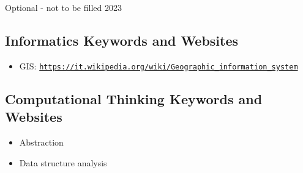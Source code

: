 \documentclass[a4paper,11pt]{report}
\newcommand{\BrochureUrlText}[1]{\texttt{#1}}
\begin{document}
Optional - not to be filled 2023


\subsection*{Informatics Keywords and Websites}

\begin{itemize}
  \item GIS: \href{https://it.wikipedia.org/wiki/Geographic_information_system}{\BrochureUrlText{https://it.wikipedia.org/wiki/Geographic\_information\_system}}
\end{itemize}


\subsection*{Computational Thinking Keywords and Websites}

\begin{itemize}
  \item Abstraction
  \item Data structure analysis
\end{itemize}
\end{document}
